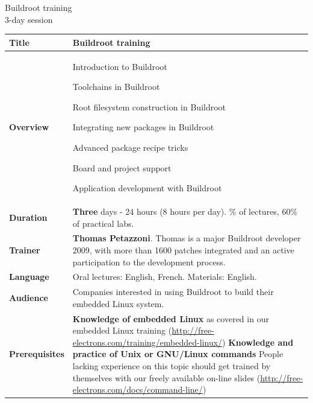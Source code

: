 \documentclass[a4paper,12pt,obeyspaces,spaces,hyphens]{article}
\begin{document}
\thispagestyle{fancy}

\setlength{\arrayrulewidth}{0.8pt}

\begin{center}
\LARGE
Buildroot training\\
\large
3-day session
\end{center}
\vspace{1cm}

\small
{}

 {
  \begin{tabularx}{\textwidth}{|g|h|}
    {\bf Title} & Buildroot training \\
    \hline

    {\bf Overview} &
    Introduction to Buildroot \par
    Toolchains in Buildroot \par
    Root filesystem construction in Buildroot \par
    Integrating new packages in Buildroot \par
    Advanced package recipe tricks \par
    Board and project support \par
    Application development with Buildroot \\
    \hline

    {\bf Duration} & {\bf Three} days - 24 hours (8 hours per day).
    \% of lectures, 60\% of practical labs. \\
    \hline

    {\bf Trainer} & {\bf Thomas Petazzoni}. Thomas is a major
    Buildroot developer 2009, with more than 1600 patches integrated
    and an active
    participation to the development process.\\
    \hline

    {\bf Language} & Oral lectures: English, French.
    \newline Materials: English.\\
    \hline

    {\bf Audience} & Companies interested in using Buildroot to build
    their
    embedded Linux system.\\
    \hline

    {\bf Prerequisites} & {\bf Knowledge of embedded Linux} as covered
    in our embedded Linux training
    (\url{http://free-electrons.com/training/embedded-linux/}) \newline
    {\bf Knowledge and practice of Unix or GNU/Linux commands}
    \newline People lacking experience on this topic should get
    trained by themselves with our freely available on-line slides
    (\url{http://free-electrons.com/docs/command-line/}) \\
    \hline


\end{tabularx}}
\end{document}
